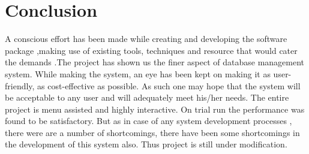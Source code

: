 \chapter{Conclusion}

A conscious effort has been made while creating and developing the software package ,making use of existing tools, techniques and resource that would cater the demands .The project has shown us the finer aspect of database management system.
While making the system, an eye has been kept on making it as user-friendly, as cost-effective as possible. As such one may hope that the system will be acceptable to any user and will adequately meet his/her needs. The entire project is menu assisted and highly interactive. On trial run the performance was found to be satisfactory. But as in case of any system development processes , there were are a number of shortcomings, there have been some shortcomings in the development of this system also. Thus project is still under modification.
